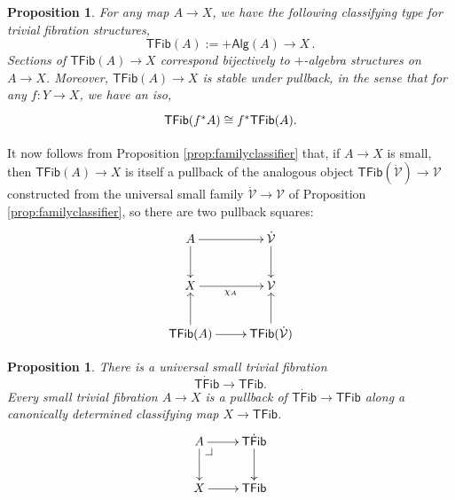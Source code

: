 \documentclass[11pt,reqno]{amsart}
\makeatletter
\newcommand{\ra}{\ensuremath{\rightarrow}}
\renewcommand{\to}{\ensuremath{\rightarrow}}
\newcommand{\V}{\ensuremath{\mathcal{V}}}
\newcommand{\VV}{\ensuremath{\dot{\mathcal{V}}}}
\newcommand{\TFib}{\ensuremath{\mathsf{TFib}}}
\newcommand{\TTFib}{\ensuremath{\dot{\mathsf{TFib}}}}
\newtheorem{proposition}[theorem]{Proposition}
\theoremstyle{remark}
\theoremstyle{definition}
\newcommand{\pbcorner}[1][dr]{\save*!/#1-1.2pc/#1:(-1,1)@^{|-}\restore}
\makeatother
\begin{document}
\begin{proposition}\label{prop:TFibstable}
For any map $A\to X$, we have the following \emph{classifying type for trivial fibration structures},
 $$\TFib(A) := +\mathsf{Alg}(A)\to X\,.$$
Sections of $\TFib(A)\to X$ correspond bijectively to $+$-algebra structures on $A\to X$.   Moreover, $\TFib(A)\to X$ is stable under pullback, in the sense that for any $f:Y\ra X$, we have an iso,
\begin{equation}\label{diagram:TFibstable}
\xymatrix{
\TFib(f^*A) \cong f^*\TFib(A).
}
\end{equation}
\end{proposition}

It now follows from Proposition \ref{prop:familyclassifier} that, if $A\ra X$ is small, then $\TFib(A) \ra X$ is itself a pullback of the analogous object $\TFib(\VV) \ra \V$ constructed from the universal small family $\VV\ra\V$ of Proposition \ref{prop:familyclassifier}, so there are two pullback squares:
\begin{equation}\label{diagram:tfib1}
\xymatrix{
A \ar[d] \ar[r]  & \VV \ar[d]\\
X \ar[r]_{\chi_A} & \V\\
\TFib(A)\ar[u] \ar[r] & \TFib(\VV)\ar[u].
}
\end{equation}


\begin{proposition}\label{prop:classTFib}
There is a \emph{universal small trivial fibration}  
\[
\TTFib\ra\TFib.
\]
 Every small trivial fibration $A \ra X$ is a pullback of $\TTFib\ra\TFib$ along a canonically determined classifying map $X\ra \TFib$.
\begin{equation}\label{diagram:classifytf}
\xymatrix{
A \ar[d] \ar[r]  \pbcorner & \TTFib\ar[d]\\
X \ar[r] & \TFib
}
\end{equation}
\end{proposition}
\end{document}
